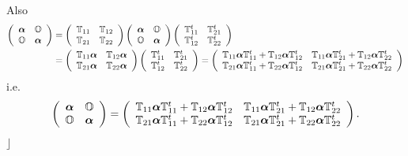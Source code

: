 \documentclass[aps,preprint]{revtex4}%
\begin{document}
Also
\begin{align}
\left(
\begin{array}
[c]{cc}%
\boldsymbol{\alpha} & \mathbb{O}\\
\mathbb{O} & \boldsymbol{\alpha}%
\end{array}
\right)   &  =\left(
\begin{array}
[c]{cc}%
\mathbb{T}_{11} & \mathbb{T}_{12}\\
\mathbb{T}_{21} & \mathbb{T}_{22}%
\end{array}
\right)  \left(
\begin{array}
[c]{cc}%
\boldsymbol{\alpha} & \mathbb{O}\\
\mathbb{O} & \boldsymbol{\alpha}%
\end{array}
\right)  \left(
\begin{array}
[c]{cc}%
\mathbb{T}_{11}^{t} & \mathbb{T}_{21}^{t}\\
\mathbb{T}_{12}^{t} & \mathbb{T}_{22}^{t}%
\end{array}
\right) \\
&  =\left(
\begin{array}
[c]{cc}%
\mathbb{T}_{11}\boldsymbol{\alpha} & \mathbb{T}_{12}\boldsymbol{\alpha}\\
\mathbb{T}_{21}\boldsymbol{\alpha} & \mathbb{T}_{22}\boldsymbol{\alpha}%
\end{array}
\right)  \left(
\begin{array}
[c]{cc}%
\mathbb{T}_{11}^{t} & \mathbb{T}_{21}^{t}\\
\mathbb{T}_{12}^{t} & \mathbb{T}_{22}^{t}%
\end{array}
\right)  =\left(
\begin{array}
[c]{cc}%
\mathbb{T}_{11}\boldsymbol{\alpha}\mathbb{T}_{11}^{t}+\mathbb{T}%
_{12}\boldsymbol{\alpha}\mathbb{T}_{12}^{t} & \mathbb{T}_{11}%
\boldsymbol{\alpha}\mathbb{T}_{21}^{t}+\mathbb{T}_{12}\boldsymbol{\alpha
}\mathbb{T}_{22}^{t}\\
\mathbb{T}_{21}\boldsymbol{\alpha}\mathbb{T}_{11}^{t}+\mathbb{T}%
_{22}\boldsymbol{\alpha}\mathbb{T}_{12}^{t} & \mathbb{T}_{21}%
\boldsymbol{\alpha}\mathbb{T}_{21}^{t}+\mathbb{T}_{22}\boldsymbol{\alpha
}\mathbb{T}_{22}^{t}%
\end{array}
\right)
\end{align}
i.e.
\begin{equation}
\left(
\begin{array}
[c]{cc}%
\boldsymbol{\alpha} & \mathbb{O}\\
\mathbb{O} & \boldsymbol{\alpha}%
\end{array}
\right)  =\left(
\begin{array}
[c]{cc}%
\mathbb{T}_{11}\boldsymbol{\alpha}\mathbb{T}_{11}^{t}+\mathbb{T}%
_{12}\boldsymbol{\alpha}\mathbb{T}_{12}^{t} & \mathbb{T}_{11}%
\boldsymbol{\alpha}\mathbb{T}_{21}^{t}+\mathbb{T}_{12}\boldsymbol{\alpha
}\mathbb{T}_{22}^{t}\\
\mathbb{T}_{21}\boldsymbol{\alpha}\mathbb{T}_{11}^{t}+\mathbb{T}%
_{22}\boldsymbol{\alpha}\mathbb{T}_{12}^{t} & \mathbb{T}_{21}%
\boldsymbol{\alpha}\mathbb{T}_{21}^{t}+\mathbb{T}_{22}\boldsymbol{\alpha
}\mathbb{T}_{22}^{t}%
\end{array}
\right)  .
\end{equation}
$\rfloor$
\end{document}
